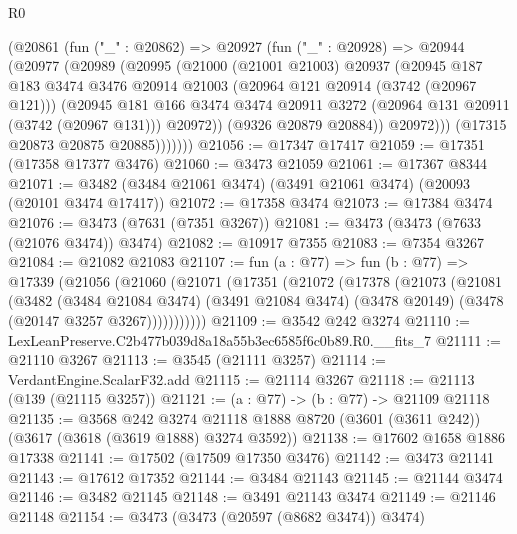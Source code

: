 \begin{lexlean}{R0}
\begin{coremodule}
          (@20861
            (fun ("_" : @20862) =>
            @20927
              (fun ("_" : @20928) =>
              @20944
                (@20977
                  (@20989
                    (@20995
                      (@21000
                        (@21001 @21003)
                        @20937
                        (@20945
                          @187
                          @183
                          @3474
                          @3476
                          @20914
                          @21003
                          (@20964 @121 @20914 (@3742 (@20967 @121)))
                          (@20945
                            @181
                            @166
                            @3474
                            @3474
                            @20911
                            @3272
                            (@20964 @131 @20911 (@3742 (@20967 @131)))
                            @20972))
                        (@9326 @20879 @20884))
                      @20972)))
                (@17315 @20873 @20875 @20885)))))))
@21056 := @17347 @17417
@21059 := @17351 (@17358 @17377 @3476)
@21060 := @3473 @21059
@21061 := @17367 @8344
@21071 := @3482 (@3484 @21061 @3474) (@3491 @21061 @3474) (@20093 (@20101 @3474 @17417))
@21072 := @17358 @3474
@21073 := @17384 @3474
@21076 := @3473 (@7631 (@7351 @3267))
@21081 := @3473 (@3473 (@7633 (@21076 @3474)) @3474)
@21082 := @10917 @7355
@21083 := @7354 @3267
@21084 := @21082 @21083
@21107 := fun (a : @77) =>
  fun (b : @77) =>
  @17339
    (@21056
      (@21060
        (@21071
          (@17351
            (@21072
              (@17378
                (@21073
                  (@21081
                    (@3482
                      (@3484 @21084 @3474)
                      (@3491 @21084 @3474)
                      (@3478 @20149)
                      (@3478 (@20147 @3257 @3267)))))))))))
@21109 := @3542 @242 @3274
@21110 := LexLeanPreserve.C2b477b039d8a18a55b3ec6585f6c0b89.R0.__fits_7
@21111 := @21110 @3267
@21113 := @3545 (@21111 @3257)
@21114 := VerdantEngine.ScalarF32.add
@21115 := @21114 @3267
@21118 := @21113 (@139 (@21115 @3257))
@21121 := (a : @77) -> (b : @77) -> @21109 @21118
@21135 := @3568
    @242
    @3274
    @21118
    @1888
    @8720
    (@3601 (@3611 @242))
    (@3617 (@3618 (@3619 @1888) @3274 @3592))
@21138 := @17602 @1658 @1886 @17338
@21141 := @17502 (@17509 @17350 @3476)
@21142 := @3473 @21141
@21143 := @17612 @17352
@21144 := @3484 @21143
@21145 := @21144 @3474
@21146 := @3482 @21145
@21148 := @3491 @21143 @3474
@21149 := @21146 @21148
@21154 := @3473 (@3473 (@20597 (@8682 @3474)) @3474)

\end{coremodule}
\end{lexlean}
